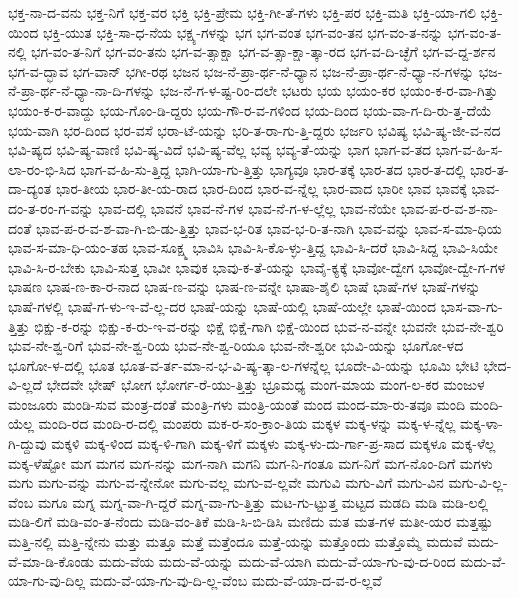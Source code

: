 {ಭಕ್ತ-ನಾ-ದ-ವನು
ಭಕ್ತ-ನಿಗೆ
ಭಕ್ತ-ವರ
ಭಕ್ತಿ
ಭಕ್ತಿ-ಪ್ರೇಮ
ಭಕ್ತಿ-ಗೀ-ತೆ-ಗಳು
ಭಕ್ತಿ-ಪರ
ಭಕ್ತಿ-ಮತಿ
ಭಕ್ತಿ-ಯಾ-ಗಲಿ
ಭಕ್ತಿ-ಯಿಂದ
ಭಕ್ತಿ-ಯುತ
ಭಕ್ತಿ-ಸಾ-ಧ-ನೆಯ
ಭಕ್ಷ್ಯ-ಗಳನ್ನು
ಭಗ
ಭಗ-ವಂತ
ಭಗ-ವಂ-ತನ
ಭಗ-ವಂ-ತ-ನನ್ನು
ಭಗ-ವಂ-ತ-ನಲ್ಲಿ
ಭಗ-ವಂ-ತ-ನಿಗೆ
ಭಗ-ವಂ-ತನು
ಭಗ-ವ-ತ್ಸಾಕ್ಷಾ
ಭಗ-ವ-ತ್ಸಾ-ಕ್ಷಾ-ತ್ಕಾ-ರದ
ಭಗ-ವ-ದಿ-ಚ್ಛೆಗೆ
ಭಗ-ವ-ದ್ದ-ರ್ಶನ
ಭಗ-ವ-ದ್ಭಾವ
ಭಗ-ವಾನ್
ಭಗೀ-ರಥ
ಭಜನ
ಭಜ-ನೆ-ಪ್ರಾ-ರ್ಥ-ನೆ-ಧ್ಯಾನ
ಭಜ-ನೆ-ಪ್ರಾ-ರ್ಥ-ನೆ-ಧ್ಯಾ-ನ-ಗಳನ್ನು
ಭಜ-ನೆ-ಪ್ರಾ-ರ್ಥ-ನೆ-ಧ್ಯಾ-ನಾ-ದಿ-ಗಳನ್ನು
ಭಜ-ನೆ-ಗ-ಳ-ಷ್ಟ-ರಿಂ-ದಲೇ
ಭಟರು
ಭಯ
ಭಯಂ-ಕರ
ಭಯಂ-ಕ-ರ-ವಾ-ಗಿತ್ತು
ಭಯಂ-ಕ-ರ-ವಾದ್ದು
ಭಯ-ಗೊಂ-ಡಿ-ದ್ದರು
ಭಯ-ಗೌ-ರ-ವ-ಗಳಿಂದ
ಭಯ-ದಿಂದ
ಭಯ-ವಾ-ಗ-ದಿ-ರು-ತ್ತ-ದೆಯೆ
ಭಯ-ವಾಗಿ
ಭರ-ದಿಂದ
ಭರ-ವಸೆ
ಭರಾ-ಟೆ-ಯನ್ನು
ಭರಿ-ತ-ರಾ-ಗು-ತ್ತಿ-ದ್ದರು
ಭರ್ಜರಿ
ಭವಿಷ್ಯ
ಭವಿ-ಷ್ಯ-ಜೀ-ವ-ನದ
ಭವಿ-ಷ್ಯದ
ಭವಿ-ಷ್ಯ-ವಾಣಿ
ಭವಿ-ಷ್ಯ-ವಿದೆ
ಭವಿ-ಷ್ಯ-ವೆಲ್ಲ
ಭವ್ಯ
ಭವ್ಯ-ತೆ-ಯನ್ನು
ಭಾಗ
ಭಾಗ-ವ-ತದ
ಭಾಗ-ವ-ಹಿ-ಸ-ಲಾ-ರಂ-ಭಿ-ಸಿದ
ಭಾಗ-ವ-ಹಿ-ಸು-ತ್ತಿದ್ದ
ಭಾಗಿ-ಯಾ-ಗು-ತ್ತಿತ್ತು
ಭಾಗ್ಯವೂ
ಭಾರ-ತಕ್ಕೆ
ಭಾರ-ತದ
ಭಾರ-ತ-ದಲ್ಲಿ
ಭಾರ-ತ-ದಾ-ದ್ಯಂತ
ಭಾರ-ತೀಯ
ಭಾರ-ತೀ-ಯ-ರಾದ
ಭಾರ-ದಿಂದ
ಭಾರ-ವ-ನ್ನೆಲ್ಲ
ಭಾರ-ವಾದ
ಭಾರೀ
ಭಾವ
ಭಾವಕ್ಕೆ
ಭಾವ-ದಂ-ತ-ರಂ-ಗ-ವನ್ನು
ಭಾವ-ದಲ್ಲಿ
ಭಾವನೆ
ಭಾವ-ನೆ-ಗಳ
ಭಾವ-ನೆ-ಗ-ಳ-ಲ್ಲೆಲ್ಲ
ಭಾವ-ನೆಯೇ
ಭಾವ-ಪ-ರ-ವ-ಶ-ನಾ-ದಂತೆ
ಭಾವ-ಪ-ರ-ವ-ಶ-ವಾ-ಗಿ-ಬಿ-ಡು-ತ್ತಿತ್ತು
ಭಾವ-ಭ-ರಿತ
ಭಾವ-ಭ-ರಿ-ತ-ನಾಗಿ
ಭಾವ-ವನ್ನು
ಭಾವ-ಸ-ಮಾ-ಧಿಯ
ಭಾವ-ಸ-ಮಾ-ಧಿ-ಯಂ-ತಹ
ಭಾವ-ಸೂಕ್ಷ್ಮ
ಭಾವಿಸಿ
ಭಾವಿ-ಸಿ-ಕೊ-ಳ್ಳು-ತ್ತಿದ್ದ
ಭಾವಿ-ಸಿ-ದರೆ
ಭಾವಿ-ಸಿದ್ದ
ಭಾವಿ-ಸಿಯೇ
ಭಾವಿ-ಸಿ-ರ-ಬೇಕು
ಭಾವಿ-ಸುತ್ತ
ಭಾವೀ
ಭಾವುಕ
ಭಾವು-ಕ-ತೆ-ಯನ್ನು
ಭಾವೈ-ಕ್ಯಕ್ಕೆ
ಭಾವೋ-ದ್ವೇಗ
ಭಾವೋ-ದ್ವೇ-ಗ-ಗಳ
ಭಾಷಣ
ಭಾಷ-ಣ-ಕಾ-ರ-ನಾದ
ಭಾಷ-ಣ-ವನ್ನು
ಭಾಷ-ಣ-ವನ್ನೇ
ಭಾಷಾ-ಶೈಲಿ
ಭಾಷೆ
ಭಾಷೆ-ಗಳ
ಭಾಷೆ-ಗಳನ್ನು
ಭಾಷೆ-ಗಳಲ್ಲಿ
ಭಾಷೆ-ಗ-ಳು-ಇ-ವೆ-ಲ್ಲ-ದರ
ಭಾಷೆ-ಯನ್ನು
ಭಾಷೆ-ಯಲ್ಲಿ
ಭಾಷೆ-ಯಲ್ಲೇ
ಭಾಷೆ-ಯಿಂದ
ಭಾಸ-ವಾ-ಗು-ತ್ತಿತ್ತು
ಭಿಕ್ಷು-ಕ-ರನ್ನು
ಭಿಕ್ಷು-ಕ-ರು-ಇ-ವ-ರನ್ನು
ಭಿಕ್ಷೆ
ಭಿಕ್ಷೆ-ಗಾಗಿ
ಭಿಕ್ಷೆ-ಯಿಂದ
ಭುವ-ನ-ವನ್ನೇ
ಭುವನೇ
ಭುವ-ನೇ-ಶ್ವರಿ
ಭುವ-ನೇ-ಶ್ವ-ರಿಗೆ
ಭುವ-ನೇ-ಶ್ವ-ರಿಯ
ಭುವ-ನೇ-ಶ್ವ-ರಿಯೂ
ಭುವ-ನೇ-ಶ್ವರೀ
ಭುವಿ-ಯನ್ನು
ಭೂಗೋ-ಳದ
ಭೂಗೋ-ಳ-ದಲ್ಲಿ
ಭೂತ
ಭೂತ-ವ-ರ್ತ-ಮಾ-ನ-ಭ-ವಿ-ಷ್ಯ-ತ್ಕಾ-ಲ-ಗಳನ್ನೆಲ್ಲ
ಭೂದೇ-ವಿ-ಯನ್ನು
ಭೂಮಿ
ಭೇಟಿ
ಭೇದ-ವಿ-ಲ್ಲದೆ
ಭೇದವೇ
ಭೇಷ್
ಭೋಗ
ಭೋರ್ಗ-ರೆ-ಯು-ತ್ತಿತ್ತು
ಭ್ರೂಮಧ್ಯ
ಮಂಗ-ಮಾಯ
ಮಂಗ-ಲ-ಕರ
ಮಂಜುಳ
ಮಂಜೂರು
ಮಂಡಿ-ಸುವ
ಮಂತ್ರ-ದಂತೆ
ಮಂತ್ರಿ-ಗಳು
ಮಂತ್ರಿ-ಯಂತೆ
ಮಂದ
ಮಂದ-ಮಾ-ರು-ತವೂ
ಮಂದಿ
ಮಂದಿ-ಯೆಲ್ಲ
ಮಂದಿ-ರದ
ಮಂದಿ-ರ-ದಲ್ಲಿ
ಮಂಪರು
ಮಕ-ರ-ಸಂ-ಕ್ರಾಂ-ತಿಯ
ಮಕ್ಕಳ
ಮಕ್ಕ-ಳನ್ನು
ಮಕ್ಕ-ಳ-ನ್ನೆಲ್ಲ
ಮಕ್ಕ-ಳಾ-ಗಿ-ದ್ದುವು
ಮಕ್ಕಳಿ
ಮಕ್ಕ-ಳಿಂದ
ಮಕ್ಕ-ಳಿ-ಗಾಗಿ
ಮಕ್ಕ-ಳಿಗೆ
ಮಕ್ಕಳು
ಮಕ್ಕ-ಳು-ದು-ರ್ಗಾ-ಪ್ರ-ಸಾದ
ಮಕ್ಕಳೂ
ಮಕ್ಕ-ಳೆಲ್ಲ
ಮಕ್ಕ-ಳೆಷ್ಟೋ
ಮಗ
ಮಗನ
ಮಗ-ನನ್ನು
ಮಗ-ನಾಗಿ
ಮಗನಿ
ಮಗ-ನಿ-ಗಂತೂ
ಮಗ-ನಿಗೆ
ಮಗ-ನೊಂ-ದಿಗೆ
ಮಗಳು
ಮಗು
ಮಗು-ವನ್ನು
ಮಗು-ವ-ನ್ನೇನೋ
ಮಗು-ವಲ್ಲ
ಮಗು-ವ-ಲ್ಲವೇ
ಮಗುವಿ
ಮಗು-ವಿಗೆ
ಮಗು-ವಿನ
ಮಗು-ವಿ-ಲ್ಲ-ವೆಂಬ
ಮಗೂ
ಮಗ್ನ
ಮಗ್ನ-ವಾ-ಗಿ-ದ್ದರೆ
ಮಗ್ನ-ವಾ-ಗು-ತ್ತಿತ್ತು
ಮಟ-ಗು-ಟ್ಟುತ್ತ
ಮಟ್ಟದ
ಮಡದಿ
ಮಡಿ
ಮಡಿ-ಲಲ್ಲಿ
ಮಡಿ-ಲಿಗೆ
ಮಡಿ-ವಂ-ತ-ನೆಂದು
ಮಡಿ-ವಂ-ತಿಕೆ
ಮಡಿ-ಸಿ-ಬಿ-ಡಿಸಿ
ಮಣಿದು
ಮತ
ಮತ-ಗಳ
ಮತೀ-ಯರ
ಮತ್ತಷ್ಟು
ಮತ್ತಿ-ನಲ್ಲಿ
ಮತ್ತಿ-ನ್ನೇನು
ಮತ್ತು
ಮತ್ತೂ
ಮತ್ತೆ
ಮತ್ತೆಂದೂ
ಮತ್ತೆ-ಯನ್ನು
ಮತ್ತೊಂದು
ಮತ್ತೊಮ್ಮೆ
ಮದುವೆ
ಮದು-ವೆ-ಮಾ-ಡಿ-ಕೊಂಡು
ಮದು-ವೆಯ
ಮದು-ವೆ-ಯನ್ನು
ಮದು-ವೆ-ಯಾಗಿ
ಮದು-ವೆ-ಯಾ-ಗು-ವು-ದ-ರಿಂದ
ಮದು-ವೆ-ಯಾ-ಗು-ವು-ದಿಲ್ಲ
ಮದು-ವೆ-ಯಾ-ಗು-ವು-ದಿ-ಲ್ಲ-ವೆಂಬ
ಮದು-ವೆ-ಯಾ-ದ-ವ-ರ-ಲ್ಲವೆ
}
